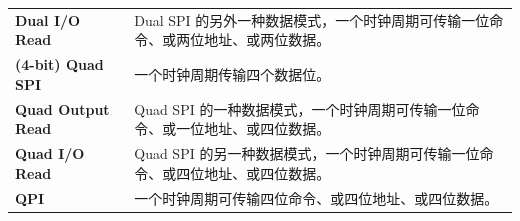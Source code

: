 \begin{longtable}[c]{ R{4cm} p{10cm} }
\textbf{Dual I/O Read} & Dual SPI 的另外一种数据模式，一个时钟周期可传输一位命令、或两位地址、或两位数据。\\
\textbf{(4-bit) Quad SPI} & 一个时钟周期传输四个数据位。\\
\textbf{Quad Output Read} & Quad SPI 的一种数据模式，一个时钟周期可传输一位命令、或一位地址、或四位数据。\\
\textbf{Quad I/O Read} & Quad SPI 的另一种数据模式，一个时钟周期可传输一位命令、或四位地址、或四位数据。\\
\textbf{QPI} & 一个时钟周期可传输四位命令、或四位地址、或四位数据。\\
\end{longtable}
